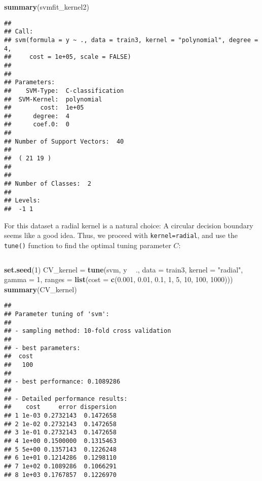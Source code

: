 \documentclass[10pt,ignorenonframetext,]{beamer}
\newenvironment{Shaded}{\begin{snugshade}}{\end{snugshade}}
\newcommand{\DataTypeTok}[1]{\textcolor[rgb]{0.13,0.29,0.53}{#1}}
\newcommand{\DecValTok}[1]{\textcolor[rgb]{0.00,0.00,0.81}{#1}}
\newcommand{\FloatTok}[1]{\textcolor[rgb]{0.00,0.00,0.81}{#1}}
\newcommand{\KeywordTok}[1]{\textcolor[rgb]{0.13,0.29,0.53}{\textbf{#1}}}
\newcommand{\NormalTok}[1]{#1}
\newcommand{\OperatorTok}[1]{\textcolor[rgb]{0.81,0.36,0.00}{\textbf{#1}}}
\newcommand{\StringTok}[1]{\textcolor[rgb]{0.31,0.60,0.02}{#1}}
\begin{document}
\begin{frame}[fragile]

\scriptsize

\begin{Shaded}
\begin{Highlighting}[]
\KeywordTok{summary}\NormalTok{(svmfit_kernel2)}
\end{Highlighting}
\end{Shaded}

\begin{verbatim}
## 
## Call:
## svm(formula = y ~ ., data = train3, kernel = "polynomial", degree = 4, 
##     cost = 1e+05, scale = FALSE)
## 
## 
## Parameters:
##    SVM-Type:  C-classification 
##  SVM-Kernel:  polynomial 
##        cost:  1e+05 
##      degree:  4 
##      coef.0:  0 
## 
## Number of Support Vectors:  40
## 
##  ( 21 19 )
## 
## 
## Number of Classes:  2 
## 
## Levels: 
##  -1 1
\end{verbatim}

\end{frame}

\begin{frame}[fragile]

For this dataset a radial kernel is a natural choice: A circular
decision boundary seems like a good idea. Thus, we proceed with
\texttt{kernel=\textquotesingle{}radial\textquotesingle{}}, and use the
\texttt{tune()} function to find the optimal tuning parameter \(C\):

\(~\)

\tiny

\begin{Shaded}
\begin{Highlighting}[]
\KeywordTok{set.seed}\NormalTok{(}\DecValTok{1}\NormalTok{)}
\NormalTok{CV_kernel =}\StringTok{ }\KeywordTok{tune}\NormalTok{(svm, y }\OperatorTok{~}\StringTok{ }\NormalTok{., }\DataTypeTok{data =}\NormalTok{ train3, }\DataTypeTok{kernel =} \StringTok{"radial"}\NormalTok{, }\DataTypeTok{gamma =} \DecValTok{1}\NormalTok{, }
    \DataTypeTok{ranges =} \KeywordTok{list}\NormalTok{(}\DataTypeTok{cost =} \KeywordTok{c}\NormalTok{(}\FloatTok{0.001}\NormalTok{, }\FloatTok{0.01}\NormalTok{, }\FloatTok{0.1}\NormalTok{, }\DecValTok{1}\NormalTok{, }\DecValTok{5}\NormalTok{, }\DecValTok{10}\NormalTok{, }\DecValTok{100}\NormalTok{, }\DecValTok{1000}\NormalTok{)))}
\KeywordTok{summary}\NormalTok{(CV_kernel)}
\end{Highlighting}
\end{Shaded}

\begin{verbatim}
## 
## Parameter tuning of 'svm':
## 
## - sampling method: 10-fold cross validation 
## 
## - best parameters:
##  cost
##   100
## 
## - best performance: 0.1089286 
## 
## - Detailed performance results:
##    cost     error dispersion
## 1 1e-03 0.2732143  0.1472658
## 2 1e-02 0.2732143  0.1472658
## 3 1e-01 0.2732143  0.1472658
## 4 1e+00 0.1500000  0.1315463
## 5 5e+00 0.1357143  0.1226248
## 6 1e+01 0.1214286  0.1298110
## 7 1e+02 0.1089286  0.1066291
## 8 1e+03 0.1767857  0.1226970
\end{verbatim}

\normalsize

\end{frame}
\end{document}
